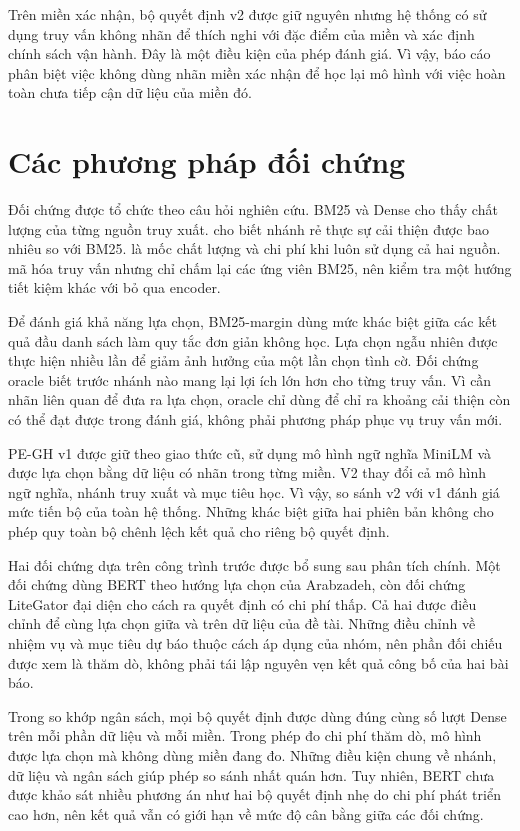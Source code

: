 Trên miền xác nhận, bộ quyết định v2 được giữ nguyên nhưng hệ thống có sử dụng truy vấn không nhãn để thích nghi với đặc điểm của miền và xác định chính sách vận hành. Đây là một điều kiện của phép đánh giá. Vì vậy, báo cáo phân biệt việc không dùng nhãn miền xác nhận để học lại mô hình với việc hoàn toàn chưa tiếp cận dữ liệu của miền đó.

\section{Các phương pháp đối chứng}
Đối chứng được tổ chức theo câu hỏi nghiên cứu. BM25 và Dense cho thấy chất lượng của từng nguồn truy xuất. \Pstar{} cho biết nhánh rẻ thực sự cải thiện được bao nhiêu so với BM25. \Hstar{} là mốc chất lượng và chi phí khi luôn sử dụng cả hai nguồn. \Rstar{} mã hóa truy vấn nhưng chỉ chấm lại các ứng viên BM25, nên kiểm tra một hướng tiết kiệm khác với bỏ qua encoder.

Để đánh giá khả năng lựa chọn, BM25-margin dùng mức khác biệt giữa các kết quả đầu danh sách làm quy tắc đơn giản không học. Lựa chọn ngẫu nhiên được thực hiện nhiều lần để giảm ảnh hưởng của một lần chọn tình cờ. Đối chứng oracle biết trước nhánh nào mang lại lợi ích lớn hơn cho từng truy vấn. Vì cần nhãn liên quan để đưa ra lựa chọn, oracle chỉ dùng để chỉ ra khoảng cải thiện còn có thể đạt được trong đánh giá, không phải phương pháp phục vụ truy vấn mới.

PE-GH v1 được giữ theo giao thức cũ, sử dụng mô hình ngữ nghĩa MiniLM \cite{minilm2020} và được lựa chọn bằng dữ liệu có nhãn trong từng miền. V2 thay đổi cả mô hình ngữ nghĩa, nhánh truy xuất và mục tiêu học. Vì vậy, so sánh v2 với v1 đánh giá mức tiến bộ của toàn hệ thống. Những khác biệt giữa hai phiên bản không cho phép quy toàn bộ chênh lệch kết quả cho riêng bộ quyết định.

Hai đối chứng dựa trên công trình trước được bổ sung sau phân tích chính. Một đối chứng dùng BERT \cite{bert2019} theo hướng lựa chọn của Arabzadeh, còn đối chứng LiteGator đại diện cho cách ra quyết định có chi phí thấp. Cả hai được điều chỉnh để cùng lựa chọn giữa \Pstar{} và \Hstar{} trên dữ liệu của đề tài. Những điều chỉnh về nhiệm vụ và mục tiêu dự báo thuộc cách áp dụng của nhóm, nên phần đối chiếu được xem là thăm dò, không phải tái lập nguyên vẹn kết quả công bố của hai bài báo.

Trong so khớp ngân sách, mọi bộ quyết định được dùng đúng cùng số lượt Dense trên mỗi phần dữ liệu và mỗi miền. Trong phép đo chi phí thăm dò, mô hình được lựa chọn mà không dùng miền đang đo. Những điều kiện chung về nhánh, dữ liệu và ngân sách giúp phép so sánh nhất quán hơn. Tuy nhiên, BERT chưa được khảo sát nhiều phương án như hai bộ quyết định nhẹ do chi phí phát triển cao hơn, nên kết quả vẫn có giới hạn về mức độ cân bằng giữa các đối chứng.

